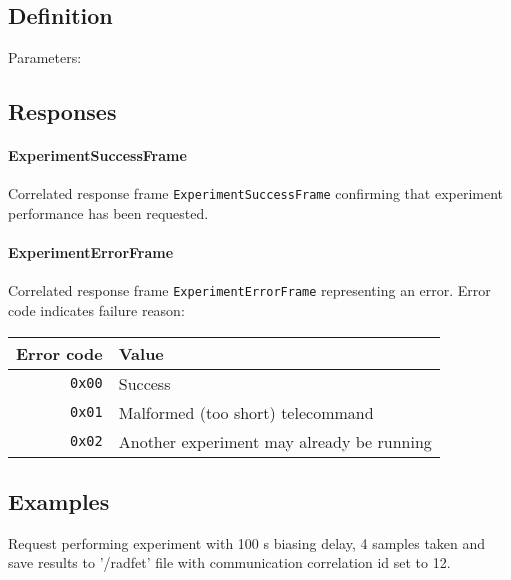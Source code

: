 \subsection{Definition}

Parameters: 

\begin{tcarglist}
\end{tcarglist}

\subsection{Responses}
\paragraph{ExperimentSuccessFrame}

Correlated response frame \texttt{ExperimentSuccessFrame} confirming 
that \radfet experiment performance has been requested.

\paragraph{ExperimentErrorFrame}
Correlated response frame \texttt{ExperimentErrorFrame} representing an error. 
Error code indicates failure reason:

\begin{tabular}{r | l}
    Error code & Value \\
    \hline
    \texttt{0x00}   & Success \\
    \texttt{0x01}   & Malformed (too short) telecommand \\
    \texttt{0x02}   & Another experiment may already be running \\
\end{tabular}

\subsection{Examples}
Request performing \radfet experiment with 100 s biasing delay, 4 samples taken and save results
to '/radfet' file with communication correlation id set to 12.

